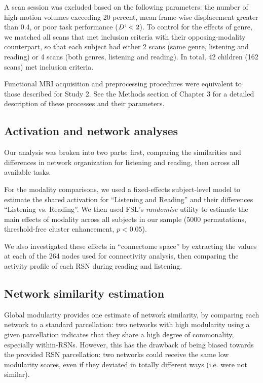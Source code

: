 A scan session was excluded based on the following parameters: the number of high-motion volumes exceeding 20 percent, mean frame-wise displacement greater than 0.4, or poor task performance ($D` < 2$). To control for the effects of genre, we matched all scans that met inclusion criteria with their opposing-modality counterpart, so that each subject had either 2 scans (same genre, listening and reading) or 4 scans (both genres, listening and reading). In total, 42 children (162 scans) met inclusion criteria.

Functional MRI acquisition and preprocessing procedures were equivalent to those described for Study 2. See the Methods section of Chapter 3 for a detailed description of these processes and their parameters.

\subsection{Activation and network analyses}

Our analysis was broken into two parts: first, comparing the similarities and differences in network organization for listening and reading, then across all available tasks. 

For the modality comparisons, we used a fixed-effects subject-level model to estimate the shared activation for ``Listening and Reading'' and their differences ``Listening vs. Reading''. We then used FSL's \textit{randomise} utility to estimate the main effects of modality across all subjects in our sample (5000 permutations, threshold-free cluster enhancement, $p < 0.05$).

We also investigated these effects in ``connectome space'' by extracting the values at each of the 264 nodes used for connectivity analysis, then comparing the activity profile of each RSN during reading and listening.

\subsection{Network similarity estimation}

Global modularity provides one estimate of network similarity, by comparing each network to a standard parcellation: two networks with high modularity using a given parcellation indicates that they share a high degree of commonality, especially within-RSNs. However, this has the drawback of being biased towards the provided RSN parcellation: two networks could receive the same low modularity scores, even if they deviated in totally different ways (i.e. were not similar). 

